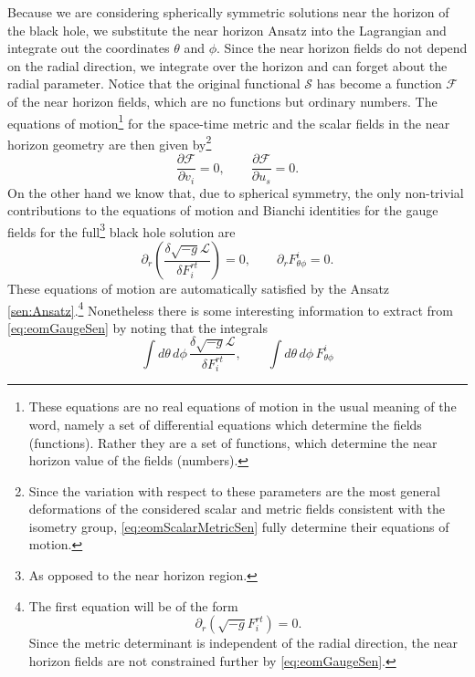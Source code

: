 \documentclass[12pt,twoside]{book}
\begin{document}
Because we are considering spherically symmetric solutions near the horizon of the black hole, we substitute the near horizon Ansatz into the Lagrangian and integrate out the coordinates $\theta$ and $\phi$. Since the near horizon fields do not depend on the radial direction, we integrate over the horizon and can forget about the radial parameter. Notice that the original functional $\mathcal{S}$ has become a function $\mathcal{F}$ of the near horizon fields, which are no functions but ordinary numbers.
The equations of motion\footnote{These equations are no real equations of motion in the usual meaning of the word, namely a set of differential equations which determine the fields (functions). Rather they are a set of functions, which determine the near horizon value of the fields (numbers).
} for the space-time metric and the scalar fields in the near horizon geometry are then given by\footnote{Since the variation with respect to these parameters are the most general deformations of the considered scalar and metric fields consistent with the isometry group, \eqref{eq:eomScalarMetricSen} fully determine their equations of motion.}
%
\begin{equation}\label{eq:eomScalarMetricSen}
\frac{\partial \mathcal{F}}{\partial v_{i}} = 0, \qquad
\frac{\partial \mathcal{F}}{\partial u_{s}} = 0.
\end{equation}
On the other hand we know that, due to spherical symmetry, the only non-trivial contributions to the equations of motion and Bianchi identities for the gauge fields for the full\footnote{As opposed to the near horizon region.} black hole solution are
%
\begin{equation}\label{eq:eomGaugeSen}
\partial_{r} \left( \frac{ \delta \sqrt{-g} \mathcal{L}}{ \delta F^{rt}_{i}} \right) = 0, \qquad
\partial_{r} F^{i}_{\theta\phi} = 0.
\end{equation}
These equations of motion are automatically satisfied by the Ansatz \eqref{sen:Ansatz}.\footnote{
The first equation will be of the form
\begin{displaymath}
\partial_{r}\left( \sqrt{-g} F^{rt}_{i} \right)=0.
\end{displaymath} Since the metric determinant is independent of the radial direction, the near horizon fields are not constrained further by \eqref{eq:eomGaugeSen}.}
Nonetheless there is some interesting information to extract from \eqref{eq:eomGaugeSen} by noting that the integrals
\begin{equation}
\int d\theta \, d\phi \, \frac{ \delta \sqrt{-g} \mathcal{L}}{ \delta F^{rt}_{i}}, \qquad
\int d\theta \, d\phi \, F^{i}_{\theta\phi}
\end{equation}
\end{document}
